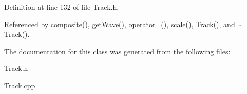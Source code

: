 Definition at line 132 of file Track.h.

Referenced by composite(), get\-Wave(), operator=(), scale(), Track(), and $\sim$Track().

The documentation for this class was generated from the following files:\begin{CompactItemize}
\item 
\hyperlink{Track_8h}{Track.h}\item 
\hyperlink{Track_8cpp}{Track.cpp}\end{CompactItemize}
